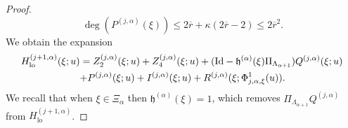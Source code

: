\documentclass[JEP,XML,SOM,Unicode,published]{cedram}
\theoremstyle{plain}
\theoremstyle{definition}
\DeclareMathOperator{\lo}{lo}
\newcommand{\1}{\mathbf{1}}
\begin{document}
\begin{proof}
\begin{equation}
\label{eq:d-P}
\deg(P^{(j,\alpha)}(\xi))\leq 2\overline{r}+\kappa(2\overline{r}-2) \leq 2\overline{r}^{2}.
\end{equation}
We obtain the expansion
\begin{multline}
\label{eq:expansion2}
\hspace*{-.5mm}H_{\lo}^{(j+1,\alpha)}(\xi;u)
= Z_{2}^{(j,\alpha)}(\xi;u) + Z_{4}^{(j,\alpha)}(\xi;u) +(\mathrm{Id} -\mathfrak{h}^{(\alpha)}(\xi)\Pi_{\Lambda_{\alpha+1}})Q^{(j,\alpha)}(\xi;u) \\
+ P^{(j,\alpha)}(\xi;u) + I^{(j,\alpha)}(\xi;u) + R^{(j,\alpha)}(\xi;\Phi_{j,\alpha,\xi}^{1}(u)).
\end{multline}
We recall that when $\xi\in\Xi_{\alpha}$ then $\mathfrak{h}^{(\alpha)}(\xi)=1$, which removes $\Pi_{\Lambda_{\alpha+1}}Q^{(j,\alpha)}$ from $H_{\lo}^{(j+1,\alpha)}$.


\end{proof}
\end{document}
